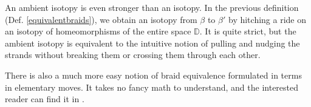 \documentclass{amsart}
\newtheorem*{comment}{Author comment}
\begin{document}
An ambient isotopy is even stronger than an isotopy. In the previous definition
(Def. \ref{equivalentbraids}), we obtain an isotopy from \(\beta\) to
\(\beta'\) by hitching a ride on an isotopy of homeomorphisms of the entire
space \(\mathbb{D}\). It is quite strict, but the ambient isotopy is equivalent
to the intuitive notion of pulling and nudging the strands without breaking
them or crossing them through each other.

\begin{remark}
   There is also a much more easy notion of braid equivalence formulated in
	terms in elementary moves. It takes no fancy math to understand, and the
	interested reader can find it in {\cite[p.~4]{mk1999}}.
\end{remark}
\end{document}
